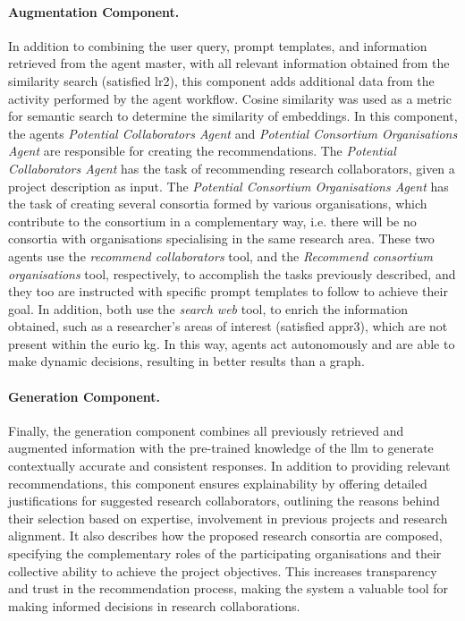 \paragraph*{Augmentation Component.}
In addition to combining the user query, prompt templates, and information retrieved from the agent master, with all relevant information obtained from the similarity search (satisfied \gls{lr}2), this component adds additional data from the activity performed by the agent workflow.
Cosine similarity was used as a metric for semantic search to determine the similarity of embeddings.
In this component, the agents \textit{Potential Collaborators Agent} and \textit{Potential Consortium Organisations Agent} are responsible for creating the recommendations.
The \textit{Potential Collaborators Agent} has the task of recommending research collaborators, given a project description as input.
The \textit{Potential Consortium Organisations Agent} has the task of creating several consortia formed by various organisations, which contribute to the consortium in a complementary way, i.e. there will be no consortia with organisations specialising in the same research area.
These two agents use the \textit{recommend collaborators} tool, and the \textit{Recommend consortium organisations} tool, respectively, to accomplish the tasks previously described, and they too are instructed with specific prompt templates to follow to achieve their goal.
In addition, both use the \textit{search web} tool, to enrich the information obtained, such as a researcher's areas of interest (satisfied \gls{appr}3), which are not present within the \gls{eurio} \gls{kg}.
In this way, agents act autonomously and are able to make dynamic decisions, resulting in better results than a graph.

\paragraph*{Generation Component.}
Finally, the generation component combines all previously retrieved and augmented information with the pre-trained knowledge of the \gls{llm} to generate contextually accurate and consistent responses.
In addition to providing relevant recommendations, this component ensures explainability by offering detailed justifications for suggested research collaborators, outlining the reasons behind their selection based on expertise, involvement in previous projects and research alignment.
It also describes how the proposed research consortia are composed, specifying the complementary roles of the participating organisations and their collective ability to achieve the project objectives.
This increases transparency and trust in the recommendation process, making the system a valuable tool for making informed decisions in research collaborations.